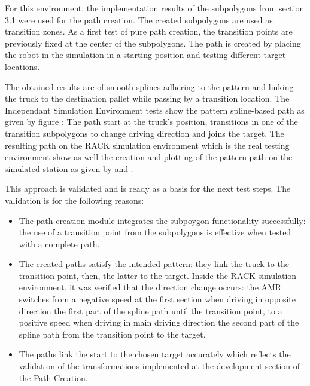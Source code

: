 For this environment, the implementation results of the subpolygons from section 3.1 were used for the path creation.
The created subpolygons are used as transition zones. 
As a first test of pure path creation, the transition points are previously fixed at the center of the 
subpolygons. The path is created by placing the robot in the simulation in a starting position and testing 
different target locations.

The obtained results are of smooth splines adhering to the pattern and linking the truck to the destination pallet 
while passing by a transition location. 
The Independant Simulation Environment tests show the pattern spline-based path as given by figure :
The path start at the truck's position, transitions in one of the transition subpolygons to change driving 
direction and joins the target. 
The resulting path on the RACK simulation environment which is the real testing environment show as well 
the creation and plotting of the pattern path on the simulated station as given by  and .

This approach is validated and is ready as a basis for the next test steps. 
The validation is for the following reasons:
\begin{itemize}
    \item The path creation module integrates the subpoygon functionality successfully: the use of a transition
    point from the subpolygons is effective when tested with a complete path.
    \item The created paths satisfy the intended pattern: they link the truck to the transition point, then, 
    the latter to the target. Inside the RACK simulation environment, it was verified that the direction 
    change occurs: the AMR switches from a negative speed at the first section when driving in opposite 
    direction the first part of the spline path until the transition point, to a positive speed when driving in 
    main driving direction the second part of the spline path from the transition point to the target.
    \item The paths link the start to the chosen target accurately which reflects the validation of the 
    transformations implemented at the development section of the Path Creation.
\end{itemize}

